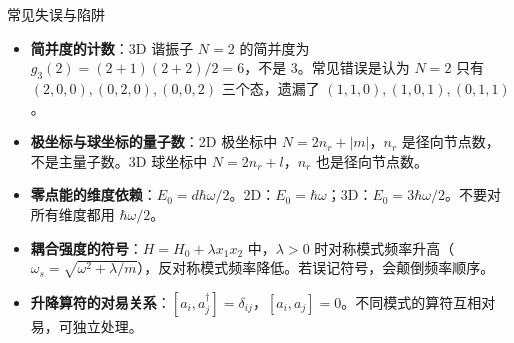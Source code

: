 \begin{errorbox}{常见失误与陷阱}
\begin{itemize}
    \item \textbf{简并度的计数}：3D 谐振子 $N=2$ 的简并度为 $g_3(2)=(2+1)(2+2)/2=6$，不是 3。常见错误是认为 $N=2$ 只有 $(2,0,0),(0,2,0),(0,0,2)$ 三个态，遗漏了 $(1,1,0),(1,0,1),(0,1,1)$。
    \item \textbf{极坐标与球坐标的量子数}：2D 极坐标中 $N=2n_r+|m|$，$n_r$ 是径向节点数，不是主量子数。3D 球坐标中 $N=2n_r+l$，$n_r$ 也是径向节点数。
    \item \textbf{零点能的维度依赖}：$E_0=d\hbar\omega/2$。2D：$E_0=\hbar\omega$；3D：$E_0=3\hbar\omega/2$。不要对所有维度都用 $\hbar\omega/2$。
    \item \textbf{耦合强度的符号}：$H=H_0+\lambda x_1x_2$ 中，$\lambda>0$ 时对称模式频率升高（$\omega_s=\sqrt{\omega^2+\lambda/m}$），反对称模式频率降低。若误记符号，会颠倒频率顺序。
    \item \textbf{升降算符的对易关系}：$[a_i,a_j^\dagger]=\delta_{ij}$，$[a_i,a_j]=0$。不同模式的算符互相对易，可独立处理。
\end{itemize}
\end{errorbox}

